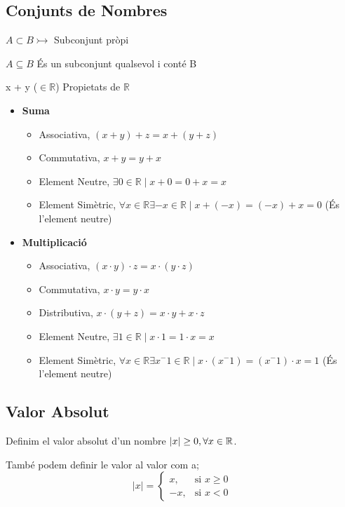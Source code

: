 \documentclass[12pt]{article}
\newcommand{\R}{\mathbb{R}}
\begin{document}
\subsection{Conjunts de Nombres}

$A \subset B \rightarrowtail$ Subconjunt pròpi

$A \subseteq B$ És un subconjunt qualsevol i conté B 

x + y ($\in \R$)
Propietats de $\R$
\begin{itemize}
    \item \textbf{Suma}
    \begin{itemize}
        \item Associativa, $(x + y) + z = x + (y + z)$
        \item Commutativa, $x + y = y + x$
        \item Element Neutre, $\exists 0 \in \R \mid x + 0 = 0 + x = x$
        \item Element Simètric, $\forall x \in \R \exists - x \in \R \mid x + (-x) = (-x) + x = 0$ (És l'element neutre)
    \end{itemize}
    \item \textbf{Multiplicació}
    \begin{itemize}
        \item Associativa, $(x\cdot y) \cdot z = x \cdot (y \cdot z)$
        \item Commutativa, $x \cdot y = y \cdot x$
        \item Distributiva, $x \cdot (y + z) = x\cdot y + x\cdot z$
        \item Element Neutre, $\exists 1 \in \R \mid x \cdot 1 = 1 \cdot x = x$
        \item Element Simètric, $\forall x \in \R \exists x^-1 \in \R \mid x \cdot (x^-1) = (x^-1) \cdot x = 1$ (És l'element neutre)
    \end{itemize}
\end{itemize}

\subsection{Valor Absolut}

Definim el valor absolut d'un nombre $\abs{x} \geq 0, \forall x \in \R$.

També podem definir le valor al valor com a;
\[
|x|=
\begin{cases}
 x, & \text{si } x\geq 0\\[4pt]
 -x, & \text{si } x<0
\end{cases}
\]
\end{document}
